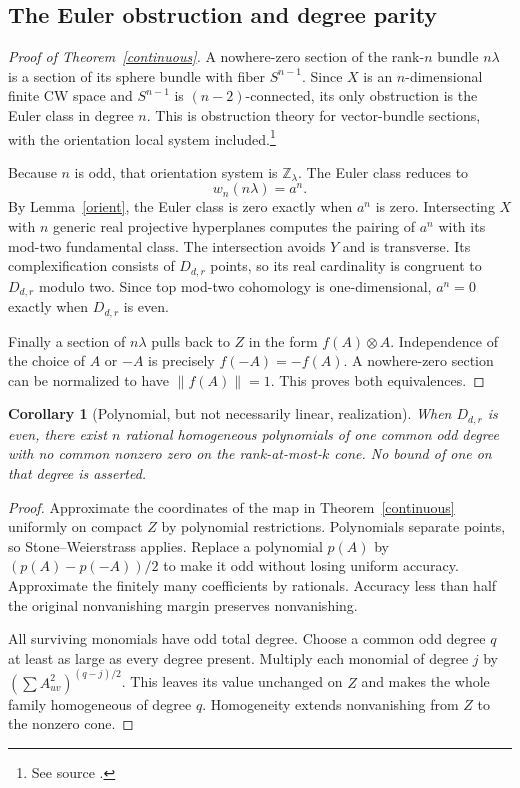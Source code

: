 \documentclass[11pt]{article}
\newtheorem{corollary}[theorem]{Corollary}
\theoremstyle{remark}\newtheorem{remark}[theorem]{Remark}
\newcommand{\Z}{\mathbb Z}\newcommand{\F}{\mathbb F_2}
\newcommand{\fnref}[1]{\footnote{See source \cite{#1}.}}
\begin{document}
\subsection{The Euler obstruction and degree parity}
\begin{proof}[Proof of Theorem~\ref{continuous}]
A nowhere-zero section of the rank-$n$ bundle $n\lambda$ is a section of its
sphere bundle with fiber $S^{n-1}$. Since $X$ is an $n$-dimensional finite CW
space and $S^{n-1}$ is $(n-2)$-connected, its only obstruction is the Euler
class in degree $n$. This is obstruction theory for vector-bundle sections,
with the orientation local system included.\fnref{hatcher}

Because $n$ is odd, that orientation system is $\Z_\lambda$. The Euler class
reduces to
\[
 w_n(n\lambda)=a^n.
\]
By Lemma~\ref{orient}, the Euler class is zero exactly when $a^n$ is zero.
Intersecting $X$ with $n$ generic real projective hyperplanes computes the
pairing of $a^n$ with its mod-two fundamental class. The intersection avoids
$Y$ and is transverse. Its complexification consists of $D_{d,r}$ points,
so its real cardinality is congruent to $D_{d,r}$ modulo two. Since top
mod-two cohomology is one-dimensional, $a^n=0$ exactly when $D_{d,r}$ is even.

Finally a section of $n\lambda$ pulls back to $Z$ in the form
$f(A)\otimes A$. Independence of the choice of $A$ or $-A$ is precisely
$f(-A)=-f(A)$. A nowhere-zero section can be normalized to have $\|f(A)\|=1$.
This proves both equivalences.
\end{proof}

\begin{corollary}[Polynomial, but not necessarily linear, realization]\label{poly}
When $D_{d,r}$ is even, there exist $n$ rational homogeneous polynomials of one
common odd degree with no common nonzero zero on the rank-at-most-$k$ cone.
No bound of one on that degree is asserted.
\end{corollary}
\begin{proof}
Approximate the coordinates of the map in Theorem~\ref{continuous} uniformly
on compact $Z$ by polynomial restrictions. Polynomials separate points, so
Stone--Weierstrass applies. Replace a polynomial $p(A)$ by
$(p(A)-p(-A))/2$ to make it odd without losing uniform accuracy. Approximate
the finitely many coefficients by rationals. Accuracy less than half the
original nonvanishing margin preserves nonvanishing.

All surviving monomials have odd total degree. Choose a common odd degree
$q$ at least as large as every degree present. Multiply each monomial of degree
$j$ by $(\sum A_{uv}^2)^{(q-j)/2}$. This leaves its value unchanged on $Z$
and makes the whole family homogeneous of degree $q$. Homogeneity extends
nonvanishing from $Z$ to the nonzero cone.
\end{proof}
\end{document}

